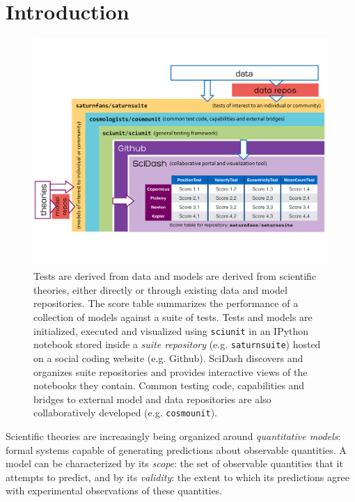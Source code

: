 \documentclass[9pt]{sig-alternate}
\begin{document}
\section{Introduction}
\begin{figure}[t]
\vspace{-30px}
\centering
\includegraphics[scale=0.45]{diagram1.pdf}
\vspace{-50px}
\caption{\small Tests are derived from data and models are derived from scientific theories, either directly or through existing data and model repositories. The score table summarizes the performance of a collection of models against a suite of tests. Tests and models are initialized, executed and visualized using \texttt{sciunit} in an IPython notebook stored inside a \emph{suite repository} (e.g. \texttt{saturnsuite}) hosted on a social coding website (e.g. Github). SciDash  discovers and organizes  suite repositories and provides interactive views of the notebooks they contain. Common testing code, capabilities and bridges to external model and data repositories are also collaboratively developed (e.g. \texttt{cosmounit}).}  
\label{fig:sciunit_overview}
\vspace{-10pt}
\end{figure}


Scientific theories are increasingly being organized around \emph{quantitative models}:  formal systems capable of generating predictions about observable quantities. A model can be  characterized by its \textit{scope}: the set of observable quantities that it attempts to predict, and by its \textit{validity}: the extent to which its predictions agree with experimental observations of these quantities. 
\end{document}
